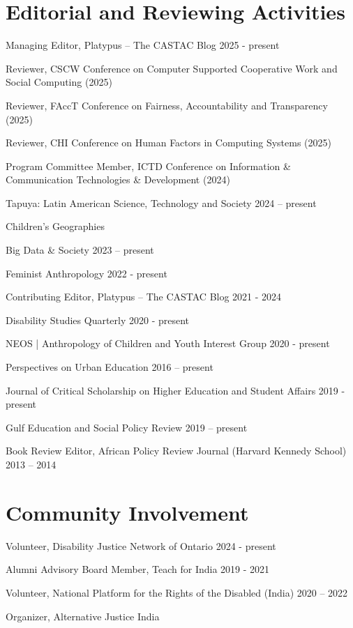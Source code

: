 \documentclass[11pt,letterpaper]{report}
\newcommand{\listitemspace}{0.25em}
\renewenvironment{itemize}{\begin{list}{}{\setlength{\leftmargin}{0em}\setlength{\parskip}{0em}\setlength{\itemsep}{\listitemspace}\setlength{\parsep}{\listitemspace}}}{\end{list}}
\begin{document}
    \section*{Editorial and Reviewing Activities}
    \begin{itemize}
        \item Managing Editor, Platypus – The CASTAC Blog 2025 - present
        \item Reviewer, CSCW Conference on Computer Supported Cooperative Work and Social Computing (2025)
        \item Reviewer, FAccT Conference on Fairness, Accountability and Transparency (2025)
        \item Reviewer, CHI Conference on Human Factors in Computing Systems (2025)
        \item Program Committee Member, ICTD Conference on Information \& Communication Technologies \& Development (2024)
        \item Tapuya: Latin American Science, Technology and Society 2024 – present
        \item Children’s Geographies
        \item Big Data \& Society 2023 – present
        \item Feminist Anthropology 2022 - present
        \item Contributing Editor, Platypus – The CASTAC Blog 2021 - 2024
        \item Disability Studies Quarterly 2020 - present
        \item NEOS | Anthropology of Children and Youth Interest Group 2020 - present
        \item Perspectives on Urban Education 2016 – present
        \item Journal of Critical Scholarship on Higher Education and Student Affairs 2019 - present
        \item Gulf Education and Social Policy Review 2019 – present
        \item Book Review Editor, African Policy Review Journal (Harvard Kennedy School) 2013 – 2014
    \end{itemize}

    \section*{Community Involvement}
    \begin{itemize}
        \item Volunteer, Disability Justice Network of Ontario 2024 - present
        \item Alumni Advisory Board Member, Teach for India 2019 - 2021
        \item Volunteer, National Platform for the Rights of the Disabled (India) 2020 – 2022
        \item Organizer, Alternative Justice India
    \end{itemize}
\end{document}
